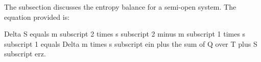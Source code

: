 The subsection discusses the entropy balance for a semi-open system. The equation provided is:

Delta S equals m subscript 2 times s subscript 2 minus m subscript 1 times s subscript 1 equals Delta m times s subscript ein plus the sum of Q over T plus S subscript erz.